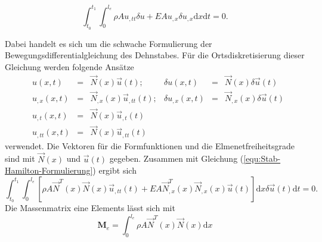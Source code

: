 \documentclass[a4paper,10pt,twoside]{article}
\numberwithin{equation}{section} %
\numberwithin{figure}{section}   %
\numberwithin{table}{section}    %
\begin{document}
	\begin{equation}\label{equ:Stab-Hamilton-Formulierung}
	\int_{t_{0}}^{t_{1}} \int_{0}^{l_{e}} \rho A u_{,tt} \delta u + E A u_{,x} \delta u_{,x} \mathrm{d}x \mathrm{d}t = 0.
	\end{equation}
	
	Dabei handelt es sich um die schwache Formulierung der Bewegungsdifferentialgleichung des Dehnstabes. Für die Ortsdiskretisierung dieser Gleichung werden folgende Ansätze
	\begin{equation}\label{equ:Stab-Hamilton-variiert}
	\begin{aligned}
	&u(x,t) &=& \vec{N}(x) \vec{u}(t); &  \delta u(x,t) &=& \vec{N}(x) \delta \vec{u}(t) \\
	&u_{,x}(x,t) &=& \vec{N}_{,x}(x) \vec{u}_{,tt}(t);  & \delta u_{,x}(x,t) &=& \vec{N}_{,x}(x) \delta \vec{u}(t)  \\
	&u_{,t}(x,t) &=& \vec{N}(x) \vec{u}_{,t}(t)\\
	&u_{,tt}(x,t) &=& \vec{N}(x) \vec{u}_{,tt}(t)  
	\end{aligned}
	\end{equation}
	verwendet. Die Vektoren für die Formfunktionen und die Elmenetfreiheitsgrade sind mit $\vec{N}(x)$ und $\vec{u}(t)$ gegeben. Zusammen mit Gleichung (\ref{equ:Stab-Hamilton-Formulierung}) ergibt sich
	\begin{equation}\label{equ:Stab-Hamilton-end}
	\int_{t_{0}}^{t_{1}} \int_{0}^{l_{e}} \left[ \rho A \vec{N}^{T}(x) \vec{N}(x) \vec{u}_{,tt}(t) + E A \vec{N}_{,x}^{T}(x) \vec{N}_{,x}(x) \vec{u}(t) \right] \mathrm{d}x \delta \vec{u}(t) \mathrm{d}t = 0.
	\end{equation}
	Die Massenmatrix eine Elements lässt sich mit
	\begin{equation}\label{equ:Stab-Me-Matrix}
	\mathbf{M}_{e} = \int_{0}^{l_{e}} \rho A \vec{N}^{T}(x) \vec{N}(x) \mathrm{d}x
	\end{equation}
	
\end{document}
